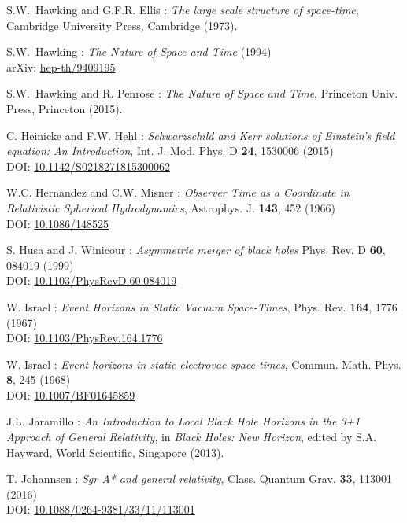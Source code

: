 \begin{thebibliography}{123}
S.W.~Hawking and G.F.R. Ellis : {\em The large scale structure of
space-time},
Cambridge University Press, Cambridge (1973).

S.W.~Hawking : {\em The Nature of Space and Time} (1994)\\
arXiv: \href{https://arxiv.org/abs/hep-th/9409195}{hep-th/9409195}

S.W.~Hawking and R. Penrose : {\em The Nature of Space and Time},
Princeton Univ. Press, Princeton (2015).

C. Heinicke and F.W. Hehl :
{\em Schwarzschild and Kerr solutions of Einstein's field equation: An Introduction},
Int. J. Mod. Phys. D {\bf 24}, 1530006 (2015)\\
DOI: \href{https://doi.org/10.1142/S0218271815300062}{10.1142/S0218271815300062}

W.C. Hernandez and C.W. Misner :
{\em Observer Time as a Coordinate in Relativistic Spherical Hydrodynamics},
Astrophys. J. {\bf 143}, 452 (1966) \\
DOI: \href{https://doi.org/10.1086/148525}{10.1086/148525}

S. Husa and J. Winicour :
{\em Asymmetric merger of black holes}
Phys. Rev. D {\bf 60}, 084019 (1999)\\
DOI: \href{https://doi.org/10.1103/PhysRevD.60.084019}{10.1103/PhysRevD.60.084019}

W. Israel : {\em Event Horizons in Static Vacuum Space-Times},
Phys. Rev. {\bf 164}, 1776 (1967)\\
DOI: \href{https://doi.org/10.1103/PhysRev.164.1776}{10.1103/PhysRev.164.1776}

W. Israel : {\em Event horizons in static electrovac space-times},
Commun. Math. Phys. {\bf 8}, 245 (1968)\\
DOI: \href{https://doi.org/10.1007/BF01645859}{10.1007/BF01645859}

J.L. Jaramillo : {\em An Introduction to Local Black Hole Horizons in the 3+1
Approach of General Relativity}, in {\em Black Holes: New Horizon}, edited
by S.A. Hayward, World Scientific, Singapore (2013).

T. Johannsen :
{\em Sgr A* and general relativity},
Class. Quantum Grav.  {\bf 33}, 113001 (2016)\\
DOI: \href{https://doi.org/10.1088/0264-9381/33/11/113001}{10.1088/0264-9381/33/11/113001}


\end{thebibliography}
